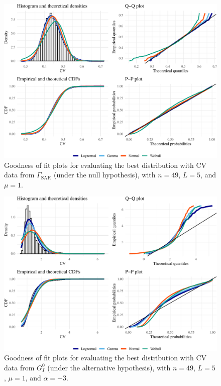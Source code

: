 \begin{figure}[H]

{\centering \includegraphics[width=0.8\linewidth]{../../Figures/PDF/Plot_cv_gamma-1} 

}

\caption{Goodness of fit plots for evaluating the best distribution with CV data from $\Gamma_{\text{SAR}}$ (under the null hypothesis), with $n=49$, $L=5$, and $\mu=1$.}\label{fig:Plot_cv_gamma}
\end{figure}

\begin{figure}[H]

{\centering \includegraphics[width=0.8\linewidth]{../../Figures/PDF/Plot_cv-1} 

}

\caption{Goodness of fit plots for evaluating the best distribution with $\text{CV}$ data from $G_I^0$ (under the alternative hypothesis), with  $n=49$, $L=5$, $\mu=1$, and $\alpha=-3$.}\label{fig:Plot_cv}
\end{figure}

